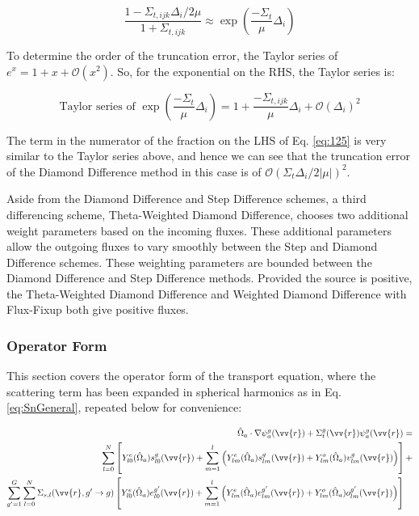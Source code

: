 \documentclass[10pt]{article}
\newcommand{\hO}{\hat{\Omega}}
\begin{document}
\begin{flushleft}
\begin{tcolorbox}[breakable]
\begin{equation}
\label{eq:125}
\frac{1-\Sigma_{t,ijk}\Delta_i/2\mu}{1+\Sigma_{t,ijk}}\approx\exp{\left(\frac{-\Sigma_t}{\mu}\Delta_i\right)}
\end{equation}

To determine the order of the truncation error, the Taylor series of \(e^x=1+x+\mathscr{O}(x^2)\). So, for the exponential on the RHS, the Taylor series is:

\begin{equation}
\text{Taylor series of } \exp{\left(\frac{-\Sigma_t}{\mu}\Delta_i\right)}=1+\frac{-\Sigma_{t,ijk}}{\mu}\Delta_i+\mathscr{O}(\Delta_i)^2
\end{equation}

The term in the numerator of the fraction on the LHS of Eq. \eqref{eq:125} is very similar to the Taylor series above, and hence we can see that the truncation error of the Diamond Difference method in this case is of \(\mathscr{O}(\Sigma_t\Delta_i/2|\mu|)^2\). 
\end{tcolorbox}

Aside from the Diamond Difference and Step Difference schemes, a third differencing scheme, Theta-Weighted Diamond Difference, chooses two additional weight parameters based on the incoming fluxes. These additional parameters allow the outgoing fluxes to vary smoothly between the Step and Diamond Difference schemes. These weighting parameters are bounded between the Diamond Difference and Step Difference methods. Provided the source is positive, the Theta-Weighted Diamond Difference and Weighted Diamond Difference with Flux-Fixup both give positive fluxes.

\subsubsection{Operator Form}

This section covers the operator form of the transport equation, where the scattering term has been expanded in spherical harmonics as in Eq. \eqref{eq:SnGeneral}, repeated below for convenience:

\begin{equation}
\label{eq:StartofOperatorForm}
\begin{aligned}
 \hO  _a\cdot\nabla\psi_a^g(\vv{r}) + 
 \Sigma_t^g(\vv{r})\psi_a^g(\vv{r}) = \\
\sum_{l=0}^{N}\left\lbrack Y_{l0}^e(\hO  _a)s_{l0}^g(\vv{r})+\sum_{m=1}^{l}\left(Y_{lm}^e(\hO  _a)s_{lm}^g(\vv{r})+Y_{lm}^o(\hO  _a)v_{lm}^g(\vv{r})\right)\right\rbrack+\\
\sum_{g'=1}^G\sum_{l=0}^{N}\Sigma_{s,l}(\vv{r}, g'\rightarrow g)\left\lbrack Y_{l0}^e(\hO  _a)e_{l0}^{g'}(\vv{r})+\sum_{m=1}^{l}\left(Y_{lm}^e(\hO  _a)e_{lm}^{g'}(\vv{r})+Y_{lm}^o(\hO  _a)o_{lm}^{g'}(\vv{r})\right)\right\rbrack\quad\\
\end{aligned}
\end{equation}


\end{flushleft}
\end{document}
